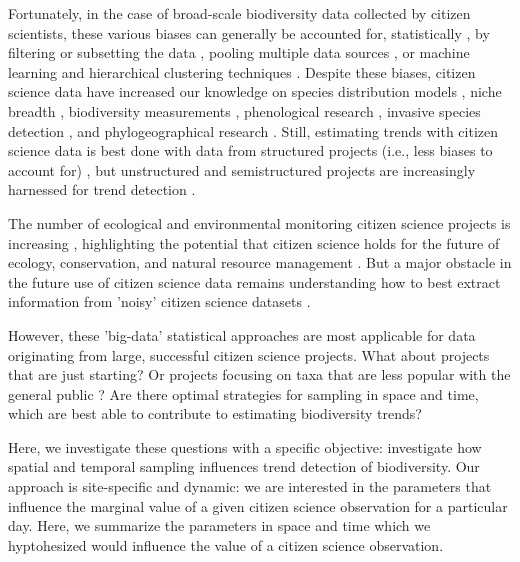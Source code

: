 \documentclass[9pt,twocolumn,twoside,lineno]{pnas-new}
\begin{document}
Fortunately, in the case of broad-scale biodiversity data collected by citizen scientists, these various biases can generally be accounted for, statistically \cite{isaac2014statistics, robinson2018correcting}, by filtering or subsetting the data \cite{wiggins2011conservation}, pooling multiple data sources \cite{fithian2015bias}, or machine learning and hierarchical clustering techniques \cite{hochachka2012data, kelling2015taking}. Despite these biases, citizen science data have increased our knowledge on species distribution models \cite{bradsworth2017species, van2013opportunistic}, niche breadth \cite{tiago2017using}, biodiversity measurements \cite{stuart2017assessing, pocock2018vision}, phenological research \cite{la2014role, supp2015citizen}, invasive species detection \cite{pocock2017citizen, grason2018citizen}, and phylogeographical research \cite{bahls2014new, drury2019continent}. Still, estimating trends with citizen science data is best done with data from structured projects (i.e., less biases to account for) \cite{fox2011new}, but unstructured and semistructured projects are increasingly harnessed for trend detection \cite{walker2017using, kery2009trend, kery2010site, horns2018using, van2013occupancy, pagel2014quantifying}.

The number of ecological and environmental monitoring citizen science projects is increasing \cite{pocock2017diversity, theobald2015global}, highlighting the potential that citizen science holds for the future of ecology, conservation, and natural resource management \cite{pocock2018vision, silvertown2009new, soroye2018opportunistic, mckinley2017citizen}. But a major obstacle in the future use of citizen science data remains understanding how to best extract information from 'noisy' citizen science datasets \cite{parrish2018exposing}.

However, these 'big-data' statistical approaches \cite{kelling2015taking} are most applicable for data originating from large, successful citizen science projects. What about projects that are just starting? Or projects focusing on taxa that are less popular with the general public \cite{mair2016explaining, ward2014understanding}? Are there optimal strategies for sampling in space and time, which are best able to contribute to estimating biodiversity trends?

Here, we investigate these questions with a specific objective: investigate how spatial and temporal sampling influences trend detection of biodiversity. Our approach is site-specific and dynamic: we are interested in the parameters that influence the marginal value of a given citizen science observation for a particular day. Here, we summarize the parameters in space and time which we hyptohesized would influence the value of a citizen science observation.
\end{document}
